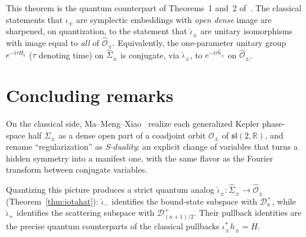 \documentclass[11pt]{article}
\theoremstyle{plain}
\theoremstyle{definition}
\theoremstyle{remark}
\newcommand{\R}{\mathbb{R}}
\newcommand{\sltwo}{\mathfrak{sl}(2,\R)}
\newcommand{\Sigmah}{\widehat{\Sigma}}
\newcommand{\OO}{\mathcal{O}}
\newcommand{\OOh}{\widehat{\mathcal{O}}}
\newcommand{\D}{\mathcal{D}}
\newcommand{\ii}{\mathrm{i}}
\begin{document}
This theorem is the quantum counterpart of Theorems~1 and~2
of~\cite{MMX2025}. The classical statements that $\iota_{\pm}$ are
symplectic embeddings with \emph{open dense} image are sharpened, on
quantization, to the statement that $\hat\iota_{\pm}$ are unitary
isomorphisms with image equal to \emph{all} of $\OOh_{\pm}$.
Equivalently, the one-parameter unitary group
$e^{-\ii\tau H_{\kappa}}$ ($\tau$ denoting time) on $\Sigmah_{\pm}$
is conjugate, via $\hat\iota_{\pm}$, to
$e^{-\ii\tau\hat h_{\pm}}$ on $\OOh_{\pm}$.


\section{Concluding remarks}\label{sec:concluding}

On the classical side, Ma--Meng--Xiao~\cite{MMX2025} realize each generalized
Kepler phase-space half $\Sigma_{\pm}$ as a dense open part of a
coadjoint orbit $\OO_{\pm}$ of $\sltwo$, and rename ``regularization'' as
\emph{S-duality}: an explicit change of variables that turns a hidden
symmetry into a manifest one, with the same flavor as the Fourier transform
between conjugate variables.

Quantizing this picture produces a strict quantum analog
$\hat\iota_{\pm}\colon\Sigmah_{\pm}\to\OOh_{\pm}$
(Theorem~\ref{thm:iotahat}): $\hat\iota_{-}$ identifies the
bound-state subspace with $\D^{+}_{\kappa}$, while $\hat\iota_{+}$
identifies the scattering subspace with $\D^{+}_{(\kappa+1)/2}$. Their pullback identities are the precise quantum
counterparts of the classical pullbacks $\iota_{\pm}^{*}h_{\pm}=H$.
\end{document}
